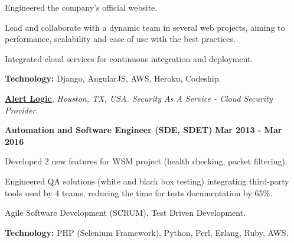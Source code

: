     \begin{innerlist}
\item Engineered the company's official website.
\item Lead and collaborate with a dynamic team in several
web projects, aiming to performance, scalability and ease of use with
the best practices.
\item Integrated cloud services for continuous integration and
deployment.
\item \textbf{Technology:} Django, AngularJS, AWS, Heroku, Codeship.
    \end{innerlist}

\quarterblankline

\href{http://alertlogic.com/}{\textbf{Alert Logic}}, \textit{Houston, TX, USA.
Security As A Service - Cloud Security Provider.}

\begin{outerlist}
\item[\FA \faAngleDoubleRight] \textbf{Automation and Software Engineer (SDE,
SDET)}
\hfill
\textbf{Mar 2013 - Mar 2016}
\end{outerlist}

    \begin{innerlist}
\item Developed 2 new features for WSM project (health checking, packet
filtering).
\item Engineered QA solutions (white and black box testing) integrating
third-party tools used by 4 teams, reducing the time for tests
documentation by 65\%.
\item Agile Software Development (SCRUM), Test Driven Development.
\item \textbf{Technology:} PHP (Selenium Framework), Python, Perl, Erlang, Ruby,
AWS.
    \end{innerlist}



